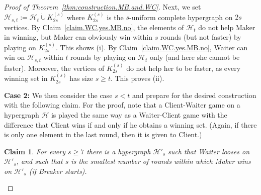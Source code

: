 \documentclass[reqno, 12pt]{amsart}
\numberwithin{equation}{section}
\numberwithin{figure}{section}
\newtheorem{claim}[theorem]{Claim}
\newcommand{\calH}{\mathcal{H}}
\begin{document}
\begin{proof}[Proof of Theorem~\ref{thm:construction.MB.and.WC}]
Next, we set $\calH_{s,t} := \calH_t \dot\cup K_{2s}^{(s)}$
where $K_{2s}^{(s)}$ is the $s$-uniform complete hypergraph on
$2s$ vertices. By Claim~\ref{claim.WC.yes.MB.no},
the elements of $\calH_t$ do not help Maker in winning,
but Maker can obviously win within $s$ rounds (but not faster)
by playing on $K_{2s}^{(s)}$. This shows (i).
By Claim~\ref{claim.WC.yes.MB.no}, Waiter can win on $\calH_{s,t}$ within $t$ rounds by playing on $\calH_t$ only (and here she cannot be faster). Moreover, the vertices of $K_{2s}^{(s)}$
do not help her to be faster, as every winning set in 
$K_{2s}^{(s)}$ has size $s\geq t$. This proves (ii).

\medskip

\textbf{Case 2:} We then consider the case $s < t$
and prepare for the desired construction 
with the following claim. For the proof, note that
a Client-Waiter game on a hypergraph $\calH$ is played
the same way as a Waiter-Client game with the difference that
Client wins if and only if he obtains a winning set.
(Again, if there is only one element in the last round,
then it is given to Client.)

\begin{claim}\label{claim.MB.yes.WC.no}
For every $s\geq 7$ there is a hypergraph $\calH'_{s}$
such that Waiter looses on $\calH'_s$,
and such that $s$ is the smallest number of rounds within which 
Maker wins on $\calH'_s$ (if Breaker starts).
\end{claim}


\end{proof}
\end{document}
